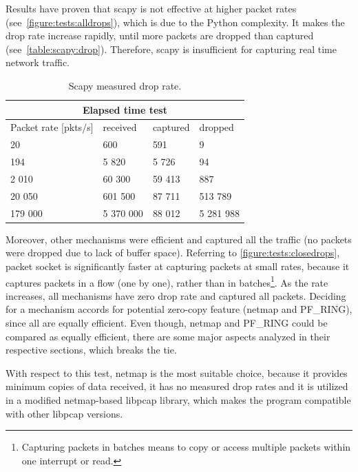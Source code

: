 \documentclass[12pt,a4paper,twoside]{report}
\begin{document}
				
				Results have proven that scapy is not effective at higher packet rates (see~\autoref{figure:tests:alldrops}), which is due to the Python complexity. It makes the drop rate increase rapidly, until more packets are dropped than captured (see~\autoref{table:scapy:drop}). Therefore, scapy is insufficient for capturing real time network traffic.
				\begin{table}[h]
					\centering
				\begin{tabular}{ |p{3cm}||p{3cm}|p{3cm}|p{3cm}| }
 					\hline
 					\multicolumn{4}{|c|}{Elapsed time test} \\
 					\hline
 					Packet rate [pkts/s] & received & captured & dropped \\
 					\hline
 					20	& 600 & 591 & 9 \\
 					194	& 5 820 & 5 726 & 94 \\
 					2 010	& 60 300 & 59 413 & 887 \\
 					20 050	& 601 500 & 87 711 & 513 789 \\
 					179 000	& 5 370 000 & 88 012 & 5 281 988 \\
 					\hline
				\end{tabular}
					\caption{Scapy measured drop rate.}
					\label{table:scapy:drop}
				\end{table}
				\par
				Moreover, other mechanisms were efficient and captured all the traffic (no packets were dropped due to lack of buffer space). Referring to \autoref{figure:tests:closedrops}, packet socket is significantly faster at capturing packets at small rates, because it captures packets in a flow (one by one), rather than in batches\footnote{Capturing packets in batches means to copy or access multiple packets within one interrupt or read.}. As the rate increases, all mechanisms have zero drop rate and captured all packets. Deciding for a mechanism accords for potential zero-copy feature (netmap and PF\_RING), since all are equally efficient. Even though, netmap and PF\_RING could be compared as equally efficient, there are some major aspects analyzed in their respective sections, which breaks the tie.\par
				With respect to this test, netmap is the most suitable choice, because it provides minimum copies of data received, it has no measured drop rates and it is utilized in a modified netmap-based libpcap library, which makes the program compatible with other libpcap versions.
\end{document}
